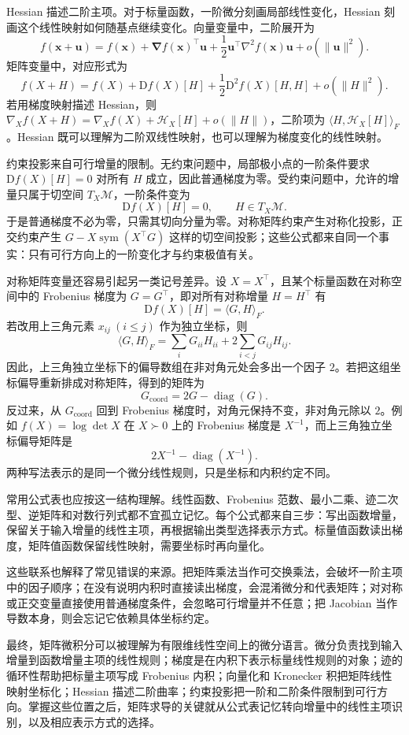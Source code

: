 Hessian 描述二阶主项。对于标量函数，一阶微分刻画局部线性变化，Hessian 刻画这个线性映射如何随基点继续变化。向量变量中，二阶展开为
\[
f(\bm{x}+\bm{u})=f(\bm{x})+\bm{\nabla} f(\bm{x})^\top \bm{u}+\frac12\bm{u}^\top\nabla^2 f(\bm{x})\bm{u}+o(\|\bm{u}\|^2).
\]
矩阵变量中，对应形式为
\[
f(X+H)=f(X)+\mathrm{D}f(X)[H]+\frac12 \mathrm{D}^2 f(X)[H,H]+o(\|H\|^2).
\]
若用梯度映射描述 Hessian，则 \(\nabla_X f(X+H)=\nabla_X f(X)+\mathcal{H}_X[H]+o(\|H\|)\)，二阶项为 \(\langle H,\mathcal{H}_X[H]\rangle_F\)。Hessian 既可以理解为二阶双线性映射，也可以理解为梯度变化的线性映射。

约束投影来自可行增量的限制。无约束问题中，局部极小点的一阶条件要求 \(\mathrm{D}f(X)[H]=0\) 对所有 \(H\) 成立，因此普通梯度为零。受约束问题中，允许的增量只属于切空间 \(T_X\mathcal{M}\)，一阶条件变为
\[
\mathrm{D}f(X)[H]=0,\qquad H\in T_X\mathcal{M}.
\]
于是普通梯度不必为零，只需其切向分量为零。对称矩阵约束产生对称化投影，正交约束产生 \(G-X\operatorname{sym}(X^\top G)\) 这样的切空间投影；这些公式都来自同一个事实：只有可行方向上的一阶变化才与约束极值有关。

对称矩阵变量还容易引起另一类记号差异。设 \(X=X^\top\)，且某个标量函数在对称空间中的 Frobenius 梯度为 \(G=G^\top\)，即对所有对称增量 \(H=H^\top\) 有
\[
\mathrm{D}f(X)[H]=\langle G,H\rangle_F.
\]
若改用上三角元素 \(x_{ij}\ (i\le j)\) 作为独立坐标，则
\[
\langle G,H\rangle_F
=\sum_i G_{ii}H_{ii}+2\sum_{i<j}G_{ij}H_{ij}.
\]
因此，上三角独立坐标下的偏导数组在非对角元处会多出一个因子 \(2\)。若把这组坐标偏导重新排成对称矩阵，得到的矩阵为
\[
G_{\mathrm{coord}}=2G-\operatorname{diag}(G).
\]
反过来，从 \(G_{\mathrm{coord}}\) 回到 Frobenius 梯度时，对角元保持不变，非对角元除以 \(2\)。例如 \(f(X)=\log\det X\) 在 \(X\succ0\) 上的 Frobenius 梯度是 \(X^{-1}\)，而上三角独立坐标偏导矩阵是
\[
2X^{-1}-\operatorname{diag}(X^{-1}).
\]
两种写法表示的是同一个微分线性规则，只是坐标和内积约定不同。

常用公式表也应按这一结构理解。线性函数、Frobenius 范数、最小二乘、迹二次型、逆矩阵和对数行列式都不宜孤立记忆。每个公式都来自三步：写出函数增量，保留关于输入增量的线性主项，再根据输出类型选择表示方式。标量值函数读出梯度，矩阵值函数保留线性映射，需要坐标时再向量化。

这些联系也解释了常见错误的来源。把矩阵乘法当作可交换乘法，会破坏一阶主项中的因子顺序；在没有说明内积时直接读出梯度，会混淆微分和代表矩阵；对对称或正交变量直接使用普通梯度条件，会忽略可行增量并不任意；把 Jacobian 当作导数本身，则会忘记它依赖具体坐标约定。

最终，矩阵微积分可以被理解为有限维线性空间上的微分语言。微分负责找到输入增量到函数增量主项的线性规则；梯度是在内积下表示标量线性规则的对象；迹的循环性帮助把标量主项写成 Frobenius 内积；向量化和 Kronecker 积把矩阵线性映射坐标化；Hessian 描述二阶曲率；约束投影把一阶和二阶条件限制到可行方向。掌握这些位置之后，矩阵求导的关键就从公式表记忆转向增量中的线性主项识别，以及相应表示方式的选择。
